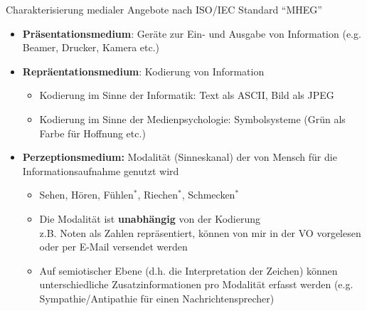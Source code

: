   \begin{bsslide}
    Charakterisierung medialer Angebote nach ISO/IEC Standard "`MHEG"'
    \begin{itemize}
      \item \textbf{Pr\"asentationsmedium}: Ger\"ate zur Ein- und Ausgabe von Information (e.g. Beamer, Drucker, Kamera etc.)
      \item \textbf{Repr\"aentationsmedium}: Kodierung von Information
      \begin{itemize}
        \item Kodierung im Sinne der Informatik: Text als ASCII, Bild als JPEG
        \item Kodierung im Sinne der Medienpsychologie: Symbolsysteme (Gr\"un als Farbe f\"ur Hoffnung etc.)
      \end{itemize}
      \item \textbf{Perzeptionsmedium:} Modalit\"at (Sinneskanal) der von  Mensch f\"ur die Informationsaufnahme genutzt wird
      \begin{itemize}
        \item Sehen, H\"oren, F\"uhlen$^*$, Riechen$^*$, Schmecken$^*$
        \item Die Modalit\"at ist \textbf{unabh\"angig} von der Kodierung\\
        z.B. Noten  als Zahlen repr\"asentiert, k\"onnen von mir in der VO vorgelesen oder per E-Mail versendet werden
        \item Auf semiotischer Ebene (d.h. die Interpretation der Zeichen) k\"onnen unterschiedliche Zusatzinformationen pro Modalit\"at erfasst werden (e.g. Sympathie/Antipathie f\"ur einen Nachrichtensprecher)
      \end{itemize}
    \end{itemize}
  \end{bsslide}
  
